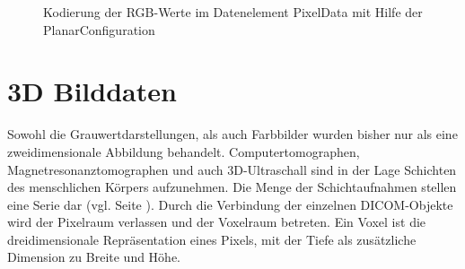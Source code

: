 \begin{figure}[htb]
\centering
{}
\caption{Kodierung der RGB-Werte im Datenelement PixelData mit Hilfe der PlanarConfiguration}
\label{planar}
\end{figure}

\FloatBarrier
\section{3D Bilddaten}
Sowohl die Grauwertdarstellungen, als auch Farbbilder wurden bisher nur als eine zweidimensionale Abbildung behandelt. Computertomographen, Magnetresonanztomographen und auch 3D-Ultraschall sind in der Lage Schichten des menschlichen Körpers aufzunehmen. Die Menge der Schichtaufnahmen stellen eine Serie dar (vgl. Seite \pageref{grundlagen:iod}). Durch die Verbindung der einzelnen DICOM-Objekte wird der Pixelraum verlassen und der Voxelraum betreten. Ein Voxel ist die dreidimensionale Repräsentation eines Pixels, mit der Tiefe als zusätzliche Dimension zu Breite und Höhe.

